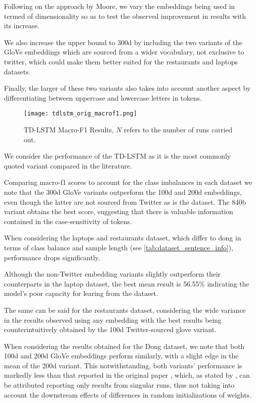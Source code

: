 \documentclass[../../fyp.tex]{subfiles}
\begin{document}
Following on the approach by Moore, we vary the embeddings being used in termed of dimensionality so as to test the observed improvement in results with its increase. 

We also increase the upper bound to 300d by including the two variants of the GloVe embeddings which are sourced from a wider vocabulary, not exclusive to twitter, which could make them better suited for the restaurants and laptops datasets. 

Finally, the larger of these two variants also takes into account another aspect by differentiating between uppercase and lowercase letters in tokens. 

\begin{figure}[!ht]
	\centering
	\texttt{[image: tdlstm\_orig\_macrof1.png]}
	\caption{TD-LSTM Macro-F1 Results, $N$ refers to the number of runs carried out.}
	\label{fig:tdlstm_orig_macrof1}
\end{figure}

We consider the performance of the TD-LSTM as it is the most commonly quoted variant compared in the literature. 

Comparing macro-f1 scores to account for the class imbalances in each dataset we note that the 300d GloVe variants outperform the 100d and 200d embeddings, even though the latter are not sourced from Twitter as is the dataset. The 840b variant obtains the best score, suggesting that there is valuable information contained in the case-sensitivity of tokens.

When considering the laptops and restaurants dataset, which differ to dong in terms of class balance and sample length (see \ref{tab:dataset_sentence_info}), performance drops significantly. 

Although the non-Twitter embedding variants slightly outperform their counterparts in the laptop dataset, the best mean result is 56.55\% indicating the model's poor capacity for learing from the dataset. 

The same can be said for the restaurants dataset, considering the wide variance in the results observed using any embedding with the best results being counterintuitively obtained by the 100d Twitter-sourced glove variant.

When considering the results obtained for the Dong dataset, we note that both 100d and 200d GloVe embeddings perform similarly, with a slight edge in the mean of the 200d variant. This notwithstanding, both variants' performance is markedly less than that reported in the original paper \citep{tang2016b}, which, as stated by \citet{moore2018}, can be attributed reporting only results from singular runs, thus not taking into account the downstream effects of differences in random initializations of weights. 
\end{document}
